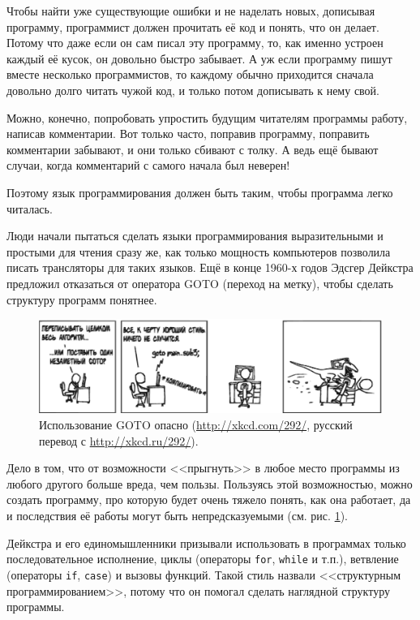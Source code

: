 \documentclass[
  paper=a4,
  fontsize=14pt,
  openany,
  appendixprefix=true
]{scrbook}
\begin{document}
Чтобы найти уже существующие ошибки и не наделать новых, дописывая программу, программист должен прочитать её код и понять, что он делает. Потому что даже если он сам писал эту программу, то, как именно устроен каждый её кусок, он довольно быстро забывает. А уж если программу пишут вместе несколько программистов, то каждому обычно приходится сначала довольно долго читать чужой код, и только потом дописывать к нему свой.

Можно, конечно, попробовать упростить будущим читателям программы работу, написав комментарии. Вот только часто, поправив программу, поправить комментарии забывают, и они только сбивают с толку. А ведь ещё бывают случаи, когда комментарий с самого начала был неверен!

Поэтому язык программирования должен быть таким, чтобы программа легко читалась.


Люди начали пытаться сделать языки программирования выразительными и простыми для чтения сразу же, как только мощность компьютеров позволила писать трансляторы для таких языков. Ещё в конце 1960-х годов Эдсгер Дейкстра предложил отказаться от оператора GOTO (переход на метку), чтобы сделать структуру программ понятнее.

\begin{figure}[!t,goto]
\includegraphics[width=180mm]{goto_russian.ps}
\caption{Использование GOTO опасно (\url{http://xkcd.com/292/}, русский перевод с \url{http://xkcd.ru/292/}).}
\label{goto}
\end{figure}

Дело в том, что от возможности <<прыгнуть>> в любое место программы из любого другого больше вреда, чем пользы. Пользуясь этой возможностью, можно создать программу, про которую будет очень тяжело понять, как она работает, да и последствия её работы могут быть непредсказуемыми (см. рис. \ref{goto}).

Дейкстра и его единомышленники призывали использовать в программах только последовательное исполнение, циклы (операторы \lstinline{for}, \lstinline{while} и т.п.), ветвление (операторы \lstinline{if}, \lstinline{case}) и вызовы функций. Такой стиль назвали <<структурным программированием>>, потому что он помогал сделать наглядной структуру программы.
\end{document}
